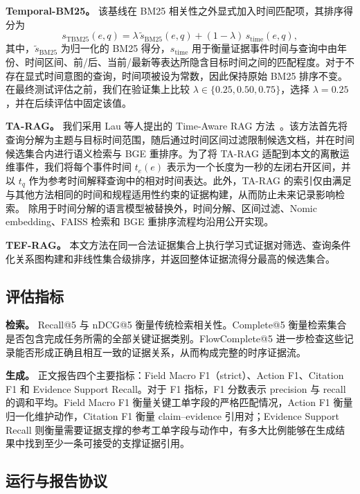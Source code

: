 \textbf{Temporal-BM25。}
该基线在 BM25 相关性之外显式加入时间匹配项，其排序得分为
\begin{equation}
s_{\mathrm{TBM25}}(e,q)
=
\lambda\,\widetilde{s}_{\mathrm{BM25}}(e,q)
+
(1-\lambda)\,s_{\mathrm{time}}(e,q),
\end{equation}
其中，$\widetilde{s}_{\mathrm{BM25}}$ 为归一化的 BM25 得分，$s_{\mathrm{time}}$ 用于衡量证据事件时间与查询中由年份、时间区间、前/后、当前/最新等表达所隐含目标时间之间的匹配程度。对于不存在显式时间意图的查询，时间项被设为常数，因此保持原始 BM25 排序不变。在最终测试评估之前，我们在验证集上比较 $\lambda\in\{0.25,0.50,0.75\}$，选择 $\lambda=0.25$，并在后续评估中固定该值。

\textbf{TA-RAG。}
我们采用 Lau 等人提出的 Time-Aware RAG 方法~\cite{lau2025tarag}。该方法首先将查询分解为主题与目标时间范围，随后通过时间区间过滤限制候选文档，并在时间候选集合内进行语义检索与 BGE 重排序。为了将 TA-RAG 适配到本文的离散运维事件，我们将每个事件时间 $t_e(e)$ 表示为一个长度为一秒的左闭右开区间，并以 $t_q$ 作为参考时间解释查询中的相对时间表达。此外，TA-RAG 的索引仅由满足与其他方法相同的时间和规程适用性约束的证据构建，从而防止未来记录影响检索。
除用于时间分解的语言模型被替换外，时间分解、区间过滤、Nomic embedding、FAISS 检索和 BGE 重排序流程均沿用公开实现。

\textbf{TEF-RAG。}
本文方法在同一合法证据集合上执行学习式证据对筛选、查询条件化关系图构建和非线性集合级排序，并返回整体证据流得分最高的候选集合。

\subsection{评估指标}
\label{sec:metrics}

\textbf{检索。}
Recall@5 与 nDCG@5 衡量传统检索相关性。Complete@5 衡量检索集合是否包含完成任务所需的全部关键证据类别。FlowComplete@5 进一步检查这些记录能否形成正确且相互一致的证据关系，从而构成完整的时序证据流。

\textbf{生成。}
正文报告四个主要指标：Field Macro F1（strict）、Action F1、Citation F1 和 Evidence Support Recall。对于 F1 指标，F1 分数表示 precision 与 recall 的调和平均。Field Macro F1 衡量关键工单字段的严格匹配情况，Action F1 衡量归一化维护动作，Citation F1 衡量 claim--evidence 引用对；Evidence Support Recall 则衡量需要证据支撑的参考工单字段与动作中，有多大比例能够在生成结果中找到至少一条可接受的支撑证据引用。

\subsection{运行与报告协议}

